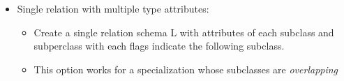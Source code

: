 \documentclass[10pt]{article}
\begin{document}
\begin{enumerate}
\begin{itemize}
\begin{itemize}
\begin{itemize}
				\item Single relation with multiple type attributes:
				\begin{itemize}
					\item Create a single relation schema L with attributes of each subclass and subperclass with each flags indicate the following subclass.
					\item This option works for a specialization whose subclasses are \textit{overlapping} 
				\end{itemize}
			\end{itemize}  
		\end{itemize}
	\end{itemize}
\end{enumerate}
\end{document}
